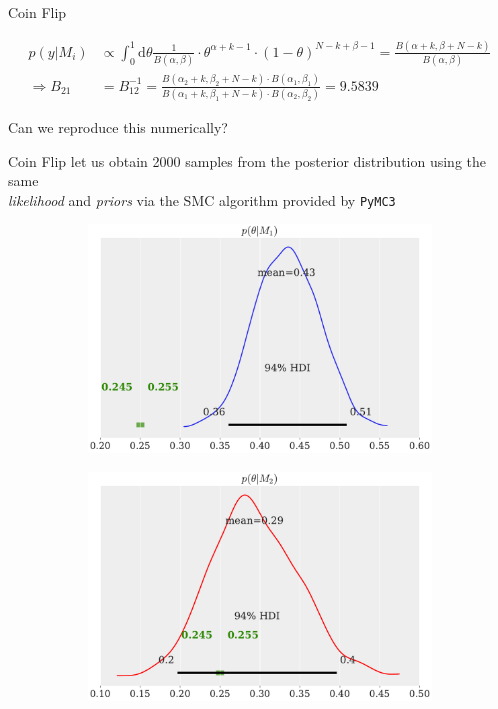 \documentclass[11pt,aspectratio=1610,dvipsnames]{beamer}
\begin{document}
\begin{frame}{Coin Flip}
	\begin{tcolorbox}[colback=black!5,colframe=gray!15!black,title=Finally computing the \textsc{Bayes} factor]
		\begin{align*}
		p(y|M_i)&\propto \int_{0}^{1} \text{d}\theta \frac{1}{B(\alpha,\beta)} \cdot \theta^{\alpha+k-1}\cdot (1-\theta)^{N-k+\beta-1}
		=\frac{B(\alpha+k,\beta+N-k)}{B(\alpha, \beta)}\\
		\Rightarrow B_{21}&=B_{12}^{-1}=\frac{B(\alpha_2+k,\beta_2+N-k)\cdot B(\alpha_1,\beta_1)}{B(\alpha_1+k,\beta_1+N-k)\cdot B(\alpha_2,\beta_2)}=9.5839
		\end{align*}
	\end{tcolorbox}
Can we reproduce this numerically?
\end{frame}
\begin{frame}{Coin Flip}
	let us obtain 2000 samples from the posterior distribution using the same \\ \emph{likelihood} and \emph{priors} via the SMC algorithm provided by \texttt{PyMC3}
	\begin{figure}[htbp]
		\begin{subfigure}{.49\linewidth}
			\includegraphics[width=0.9\linewidth]{coin_marp_m1.pdf}
			\subcaption{}\label{fig:coin_marp_a}
		\end{subfigure}
		\begin{subfigure}{.49\linewidth}
			\includegraphics[width=0.9\linewidth]{coin_marp_m2.pdf}

\end{subfigure}
\end{figure}
\end{frame}
\end{document}
